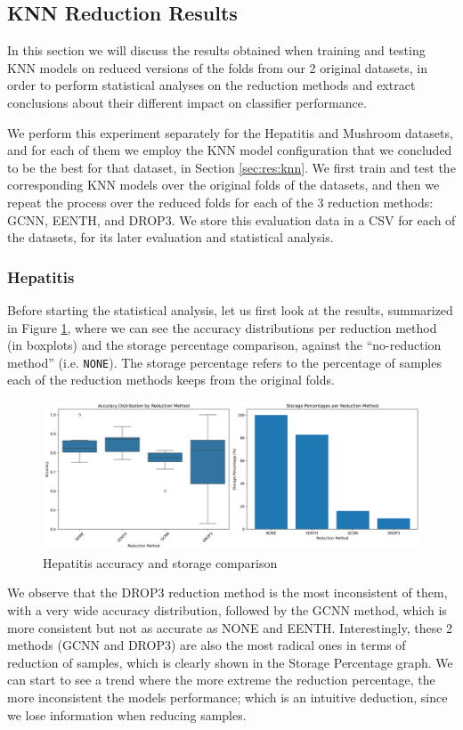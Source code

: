 \subsection{KNN Reduction Results}
In this section we will discuss the results obtained when training and testing KNN models on reduced versions of the folds from our 2 original datasets, in order to perform statistical analyses on the reduction methods and extract conclusions about their different impact on classifier performance.

We perform this experiment separately for the Hepatitis and Mushroom datasets, and for each of them we employ the KNN model configuration that we concluded to be the best for that dataset, in Section \ref{sec:res:knn}. We first train and test the corresponding KNN models over the original folds of the datasets, and then we repeat the process over the reduced folds for each of the 3 reduction methods: GCNN, EENTH, and DROP3. We store this evaluation data in a CSV for each of the datasets, for its later evaluation and statistical analysis.

\subsubsection{Hepatitis}
Before starting the statistical analysis, let us first look at the results, summarized in Figure \ref{fig:hep:reduction}, where we can see the accuracy distributions per reduction method (in boxplots) and the storage percentage comparison, against the ``no-reduction method'' (i.e. \texttt{NONE}). The storage percentage refers to the percentage of samples each of the reduction methods keeps from the original folds.
\begin{figure}[H]
    \centering
    \includegraphics[width=\textwidth]{figures/knn/hepatitis/accuracy_storage_comparison.png}
    \caption{Hepatitis accuracy and storage comparison}
    \label{fig:hep:reduction}
\end{figure}

We observe that the DROP3 reduction method is the most inconsistent of them, with a very wide accuracy distribution, followed by the GCNN method, which is more consistent but not as accurate as NONE and EENTH. Interestingly, these 2 methods (GCNN and DROP3) are also the most radical ones in terms of reduction of samples, which is clearly shown in the Storage Percentage graph. We can start to see a trend where the more extreme the reduction percentage, the more inconsistent the models performance; which is an intuitive deduction, since we lose information when reducing samples.

